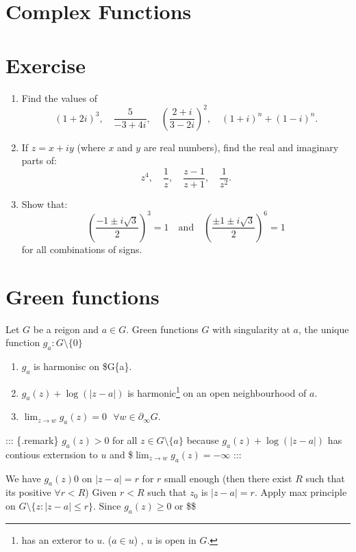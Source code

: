 \documentclass[
]{book}
\providecommand{\tightlist}{%
  \setlength{\itemsep}{0pt}\setlength{\parskip}{0pt}}
\theoremstyle{definition}
\theoremstyle{definition}
\theoremstyle{definition}
\theoremstyle{definition}
\theoremstyle{remark}
\begin{document}
\chapter{Complex Functions}\label{complex-functions}

\chapter{Exercise}\label{exercise}

\begin{enumerate}
\def\labelenumi{\arabic{enumi}.}
\item
  Find the values of
  \[    (1 + 2i)^3, \quad \frac{5}{-3 + 4i}, \quad \left( \frac{2 + i}{3 - 2i} \right)^2, \quad (1 + i)^n + (1 - i)^n.\]
\item
  If \(z = x + iy\) (where \(x\) and \(y\) are real numbers), find the real and imaginary parts of:
  \[z^4, \quad \frac{1}{z}, \quad \frac{z - 1}{z + 1}, \quad \frac{1}{z^2}.\]
\item
  Show that:
  \[  \left( \frac{-1 \pm i\sqrt{3}}{2} \right)^3 = 1 \quad \text{and} \quad \left( \frac{\pm 1 \pm i\sqrt{3}}{2} \right)^6 = 1\]
  for all combinations of signs.
\end{enumerate}

\chapter{Green functions}\label{green-functions}

Let \(G\) be a reigon and \(a\in G\). Green functions \(G\) with singularity at \(a\), the unique function \(g_a:G\setminus \{0\}\)

\begin{enumerate}
\def\labelenumi{\arabic{enumi}.}
\tightlist
\item
  \(g_a\) is harmonisc on \$G\setminus\{a\}.
\item
  \(g_a(z)+\log(|z-a|)\) is harmonic\footnote{has an exteror to \(u\). (\(a\in u\)) , \(u\) is open in \(G\).} on an open neighbourhood of \(a\).
\item
  \(\lim_{z\to w}g_a(z)=0 ~~~\forall w \in \partial_\infty G\).
\end{enumerate}

::: \{.remark\}
\(g_a(z)>0\) for all \(z \in G\setminus \{a\}\) because \(g_a(z)+\log(|z-a|)\) has contious externsion to \(u\) and \$\(\lim_{z\to w}g_a(z)=-\infty\)
:::

We have \(g_a(z)0\) on \(|z-a|=r\) for \(r\) small enough (then there exist \(R\) such that its positive \(\forall r<R\)) Given \(r<R\) such that \(z_0\) is \(|z-a|=r\). Apply max principle on \(G\setminus\{z:|z-a|\leq r\}\). Since \(g_a(z)\geq 0\) or \$\$
\end{document}
